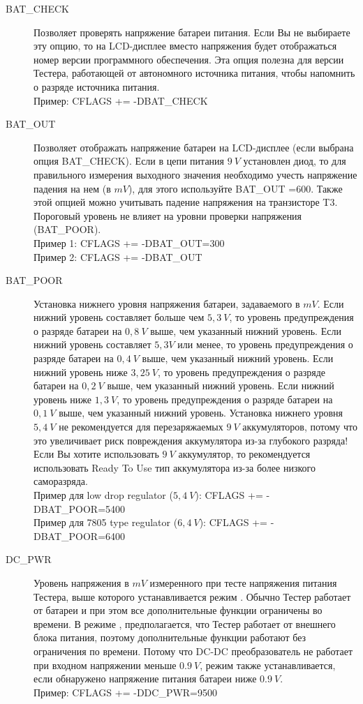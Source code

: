 \begin{description}
  \item[BAT\_CHECK] Позволяет проверять напряжение батареи питания. Если Вы не выбираете эту опцию, то на  
LCD-дисплее вместо напряжения будет отображаться номер версии программного обеспечения. Эта опция полезна для 
версии Тестера, работающей от автономного источника питания, чтобы напомнить о разряде источника питания.\\
Пример: CFLAGS += -DBAT\_CHECK

  \item[BAT\_OUT] Позволяет отображать напряжение батареи на LCD-дисплее (если выбрана опция BAT\_CHECK). Если 
в цепи питания \(9~V\) установлен диод, то для правильного измерения выходного значения необходимо учесть напряжение 
падения на нем (в \(mV\)), для этого используйте  BAT\_OUT =600. Также этой опцией можно учитывать падение напряжения 
на транзисторе T3. Пороговый уровень не влияет на уровни проверки напряжения (BAT\_POOR).\\
Пример 1: CFLAGS += -DBAT\_OUT=300\\
Пример 2: CFLAGS += -DBAT\_OUT

  \item[BAT\_POOR] Установка нижнего уровня напряжения батареи, задаваемого в \(mV\). 
Если нижний уровень составляет больше чем \(5,3~V\), то уровень предупреждения о разряде батареи на \(0,8~V\) выше, 
чем указанный нижний уровень. 
Если нижний уровень составляет \(5,3 V\) или менее, то уровень предупреждения о разряде батареи на \(0,4~V\) выше, 
чем указанный нижний уровень. 
Если нижний уровень ниже \(3,25~V\), то уровень предупреждения о разряде батареи на \(0,2~V\) выше, чем указанный 
нижний уровень. 
Если нижний уровень ниже \(1,3~V\), то уровень предупреждения о разряде батареи на \(0,1~V\) выше, чем указанный 
нижний уровень. 
Установка нижнего уровня \(5,4~V\) не рекомендуется для перезаряжаемых \(9~V\) аккумуляторов, потому что это 
увеличивает риск повреждения аккумулятора из-за глубокого разряда! Если Вы хотите использовать \(9~V\) аккумулятор, 
то рекомендуется использовать Ready To Use тип аккумулятора из-за более низкого саморазряда.\\
Пример для low drop regulator (\(5,4~V\)): CFLAGS += -DBAT\_POOR=5400\\
Пример для 7805 type regulator (\(6,4~V\)): CFLAGS += -DBAT\_POOR=6400

  \item[DC\_PWR] Уровень напряжения в \(mV\) измеренного при тесте напряжения питания Тестера, выше
  которого устанавливается режим . Обычно Тестер работает от батареи и при этом все 
дополнительные функции ограничены во времени. В режиме , предполагается, что Тестер работает 
от внешнего блока питания, поэтому дополнительные функции работают без ограничения по времени.
Потому что DC-DC преобразователь не работает при входном напряжении меньше \(0.9~V\),
режим  также устанавливается, если обнаружено напряжение питания батареи ниже \(0.9~V\). \\
Пример: CFLAGS += -DDC\_PWR=9500


\end{description}
